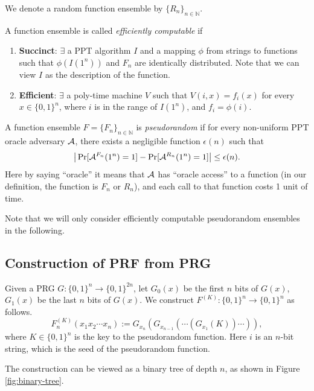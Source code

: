 \begin{definition}
We denote a random function ensemble by $\{R_n\}_{n \in \mathbb{N}}$.
\end{definition}

\begin{definition}
A function ensemble is called \emph{efficiently computable} if
\begin{enumerate}[label=(\alph*)]
    \item \textbf{Succinct}:
        $\exists$ a PPT algorithm $I$ and a mapping $\phi$ from strings to functions such that
        $\phi(I(1^n))$ and $F_n$ are identically distributed.
        Note that we can view $I$ as the description of the function.
    \item \textbf{Efficient}:
        $\exists$ a poly-time machine $V$ such that
        $V(i, x) = f_i(x)$ for every $x \in \{0, 1\}^n$, where $i$ is in the range of $I(1^n)$, and $f_i = \phi(i)$.
\end{enumerate}
\end{definition}

\begin{definition}
A function ensemble $F = \{F_n\}_{n \in \mathbb{N}}$ is \emph{pseudorandom} if
for every non-uniform PPT oracle adversary ${\mathcal A}$, there exists a negligible function $\epsilon(n)$ such that
\[
\big| \Pr[{\mathcal A}^{F_n} (1^n) = 1] - \Pr[{\mathcal A}^{R_n} (1^n) = 1]  \big| \leq \epsilon(n).
\]
Here by saying ``oracle'' it means that ${\mathcal A}$ has ``oracle access'' to a function (in our definition, the function is $F_n$ or $R_n$), and each call to that function costs 1 unit of time.
\end{definition}

Note that we will only consider efficiently computable pseudorandom ensembles in the following.

\subsection{Construction of PRF from PRG}

\begin{construction}
Given a PRG $G: \{0, 1\}^n \rightarrow \{0, 1\}^{2n}$,
let $G_0(x)$ be the first $n$ bits of $G(x)$, $G_1(x)$ be the last $n$ bits of $G(x)$.
We construct $F^{(K)}: \{0, 1\}^n \rightarrow \{0, 1\}^n$ as follows.
\[
F^{(K)}_n(x_1 x_2 \cdots x_n) := G_{x_n}(G_{x_{n-1}} (\cdots(G_{x_1}(K)) \cdots  )),
\]
where $K \in \{0,1\}^n$ is the key to the pseudorandom function. Here $i$ is an $n$-bit string, which is the seed of the pseudorandom function.
\end{construction}
The construction can be viewed as a binary tree of depth $n$, as shown in Figure \ref{fig:binary-tree}.

